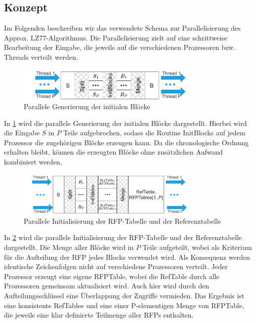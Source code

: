 \subsection{Konzept}
Im Folgenden beschreiben wir das verwendete Schema zur Parallelisierung des Approx. LZ77-Algorithmus. Die Parallelisierung zielt auf eine schrittweise Bearbeitung der Eingabe, die jeweils
auf die verschiedenen Prozessoren bzw. Threads verteilt werden. 
\begin{figure}[h]
    \centering
    \includegraphics[width=0.8\textwidth]{Images/parallel_initnodes.png}
    \caption{Parallele Generierung der initialen Blöcke}
    \label{fig:parinitnodes}
\end{figure}
In \ref{fig:parinitnodes} wird die parallele Generierung der initialen Blöcke dargestellt. Hierbei wird die Eingabe $S$ in $P$ Teile aufgebrochen, sodass die Routine InitBlocks auf jedem Prozessor
die zugehörigen Blöcke erzeugen kann. Da die chronologische Ordnung erhalten bleibt, können die erzeugten Blöcke ohne zusätzlichen Aufwand kombiniert werden.

\begin{figure}[h]
    \centering
    \includegraphics[width=0.8\textwidth]{Images/parallel_inittables.png}
    \caption{Parallele Initialisierung der RFP-Tabelle und der Referenztabelle}
    \label{fig:parinittables}
\end{figure}
In \ref{fig:parinittables} wird die parallele Initialisierung der RFP-Tabelle und der Referenztabelle dargestellt. Die Menge aller Blöcke wird in $P$ Teile aufgeteilt, wobei als Kriterium für die
Aufteilung der RFP jedes Blocks verwendet wird. Als Konsequenz werden identische Zeichenfolgen nicht auf verschiedene Prozessoren verteilt. Jeder Prozessor erzeugt eine eigene RFPTable, wobei
die RefTable durch alle Prozessoren gemeinsam aktualisiert wird. Auch hier wird durch den Aufteilungsschlüssel eine Überlappung der Zugriffe vermieden. Das Ergebnis ist eine konsistente
RefTablee und eine einer P-elementigen Menge von RFPTable, die jeweils eine klar definierte Teilmenge aller RFPs enthalten.

